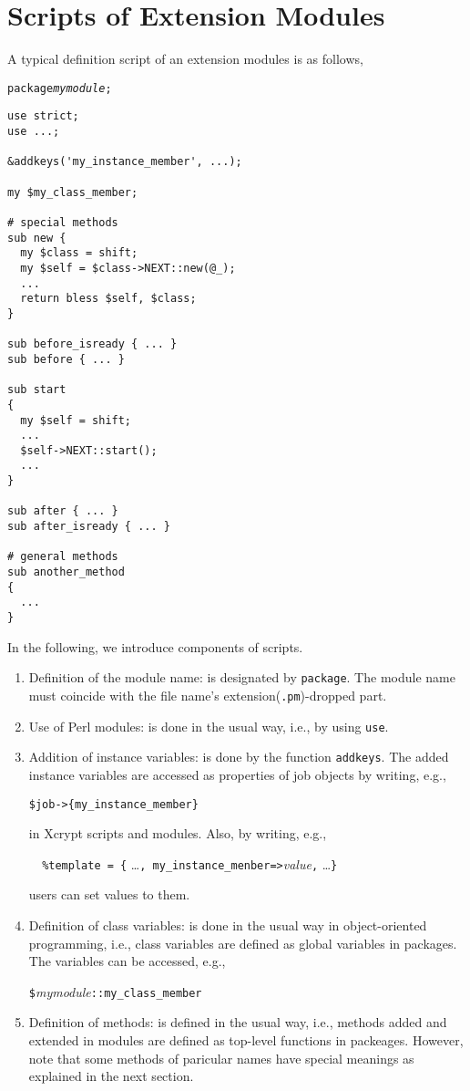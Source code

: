 \documentclass[a4paper,10pt]{report}
\def\|{\verb|} %|
\begin{document}
\section{Scripts of Extension Modules}

A typical definition script of an extension modules is as follows,
\begin{boxnote}
  \begin{alltt}
package {\it mymodule};
  \end{alltt}
\begin{verbatim}
use strict;
use ...;

&addkeys('my_instance_member', ...);

my $my_class_member;

# special methods
sub new {
  my $class = shift;
  my $self = $class->NEXT::new(@_);
  ... 
  return bless $self, $class;
}

sub before_isready { ... }
sub before { ... }

sub start
{
  my $self = shift;
  ...
  $self->NEXT::start();
  ...
}

sub after { ... }
sub after_isready { ... }

# general methods
sub another_method
{
  ...
}
\end{verbatim}
\end{boxnote}
\vspace{\baselineskip}

In the following, we introduce components of scripts.
\begin{enumerate}
  \item Definition of the module name: is designated by \|package|.
	The module name must coincide with the file name's
	extension(\|.pm|)-dropped part.
  \item Use of Perl modules: is done in the usual way, i.e., by using
	\|use|.
  \item Addition of instance variables: is done by the function
	\|addkeys|.  The added instance variables are accessed as
	properties of job objects by writing, e.g.,
	\begin{center}
	 \|$job->{my_instance_member}|
	\end{center}
	in Xcrypt scripts and modules.  Also, by writing, e.g.,
	\begin{center}
	 \|  |\|%
	\end{center}
	users can set values to them.
 \item Definition of class variables: is done in the usual way in
       object-oriented programming, i.e., class variables are defined
       as global variables in packages.  The variables can be
       accessed, e.g.,
	 \begin{center}
	  \|$|{\it mymodule}\|::my_class_member|
	 \end{center}
  \item Definition of methods: is defined in the usual way, i.e.,
	methods added and extended in modules are defined as top-level
	functions in packeages.  However, note that some methods of
	paricular names have special meanings as explained in the next
	section.
\end{enumerate}
\end{document}
